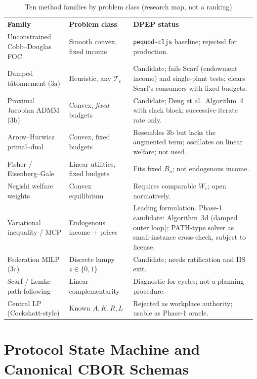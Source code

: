 \documentclass[10pt,twoside,openany]{book}
\theoremstyle{dpepstyle}
\begin{document}
\begin{table}[htbp]
\centering
\caption{Ten method families by problem class (research map, not a ranking)}
\label{tab:method-families}
\scriptsize
\begin{tabularx}{\textwidth}{L{1.35in} L{1.25in} Y}
\toprule
\textbf{Family} & \textbf{Problem class} & \textbf{DPEP status} \\
\midrule
Unconstrained Cobb--Douglas FOC & Smooth convex, fixed income & \texttt{pequod-cljs} baseline; rejected for production. \\
Damped t\^atonnement (3a) & Heuristic, any $\mathcal{T}_c$ & Candidate; fails Scarf (endowment income) and single-plant tests; clears Scarf's consumers with fixed budgets. \\
Proximal Jacobian ADMM (3b) & Convex, \emph{fixed} budgets & Candidate; Deng et al.\ Algorithm~4 with slack block; successive-iterate rate only. \\
Arrow--Hurwicz primal--dual & Convex, fixed budgets & Resembles 3b but lacks the augmented term; oscillates on linear welfare; not used. \\
Fisher / Eisenberg--Gale & Linear utilities, fixed budgets & Fits fixed $B_u$; not endogenous income. \\
Negishi welfare weights & Convex equilibrium & Requires comparable $W_c$; open normatively. \\
Variational inequality / MCP & Endogenous income + prices & Leading formulation. Phase-1 candidate: Algorithm~3d (damped outer loop); PATH-type solver as small-instance cross-check, subject to license. \\
Federation MILP (3c) & Discrete lumpy $z\in\{0,1\}$ & Candidate; needs ratification and IIS exit. \\
Scarf / Lemke path-following & Linear complementarity & Diagnostic for cycles; not a planning procedure. \\
Central LP (Cockshott-style) & Known $A,K,R,L$ & Rejected as workplace authority; usable as Phase-1 oracle. \\
\bottomrule
\end{tabularx}
\end{table}

\section{Protocol State Machine and Canonical CBOR Schemas}
\label{sec:cbor-schemas}
\end{document}
